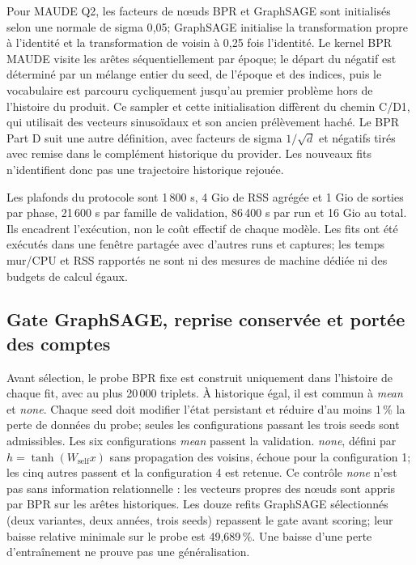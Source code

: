 Pour MAUDE Q2, les facteurs de nœuds BPR et GraphSAGE sont initialisés selon une normale de sigma 0{,}05; GraphSAGE initialise la transformation propre à l'identité et la transformation de voisin à 0{,}25 fois l'identité. Le kernel BPR MAUDE visite les arêtes séquentiellement par époque; le départ du négatif est déterminé par un mélange entier du seed, de l'époque et des indices, puis le vocabulaire est parcouru cycliquement jusqu'au premier problème hors de l'histoire du produit. Ce sampler et cette initialisation diffèrent du chemin C/D1, qui utilisait des vecteurs sinusoïdaux et son ancien prélèvement haché. Le BPR Part D suit une autre définition, avec facteurs de sigma $1/\sqrt{d}$ et négatifs tirés avec remise dans le complément historique du provider. Les nouveaux fits n'identifient donc pas une trajectoire historique rejouée.

Les plafonds du protocole sont 1\,800 s, 4 Gio de RSS agrégée et 1 Gio de sorties par phase, 21\,600 s par famille de validation, 86\,400 s par run et 16 Gio au total. Ils encadrent l'exécution, non le coût effectif de chaque modèle. Les fits ont été exécutés dans une fenêtre partagée avec d'autres runs et captures; les temps mur/CPU et RSS rapportés ne sont ni des mesures de machine dédiée ni des budgets de calcul égaux.

\subsection{Gate GraphSAGE, reprise conservée et portée des comptes}

Avant sélection, le probe BPR fixe est construit uniquement dans l'histoire de chaque fit, avec au plus 20\,000 triplets. À historique égal, il est commun à \emph{mean} et \emph{none}. Chaque seed doit modifier l'état persistant et réduire d'au moins 1\,\% la perte de données du probe; seules les configurations passant les trois seeds sont admissibles. Les six configurations \emph{mean} passent la validation. \emph{none}, défini par $h=\tanh(W_{\mathrm{self}}x)$ sans propagation des voisins, échoue pour la configuration 1; les cinq autres passent et la configuration 4 est retenue. Ce contrôle \emph{none} n'est pas sans information relationnelle : les vecteurs propres des nœuds sont appris par BPR sur les arêtes historiques. Les douze refits GraphSAGE sélectionnés (deux variantes, deux années, trois seeds) repassent le gate avant scoring; leur baisse relative minimale sur le probe est 49{,}689\,\%. Une baisse d'une perte d'entraînement ne prouve pas une généralisation.

